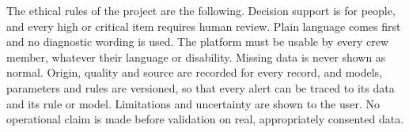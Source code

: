 The ethical rules of the project are the following. Decision support is for people, and every high or critical item requires human review. Plain language comes first and no diagnostic wording is used. The platform must be usable by every crew member, whatever their language or disability. Missing data is never shown as normal. Origin, quality and source are recorded for every record, and models, parameters and rules are versioned, so that every alert can be traced to its data and its rule or model. Limitations and uncertainty are shown to the user. No operational claim is made before validation on real, appropriately consented data.
